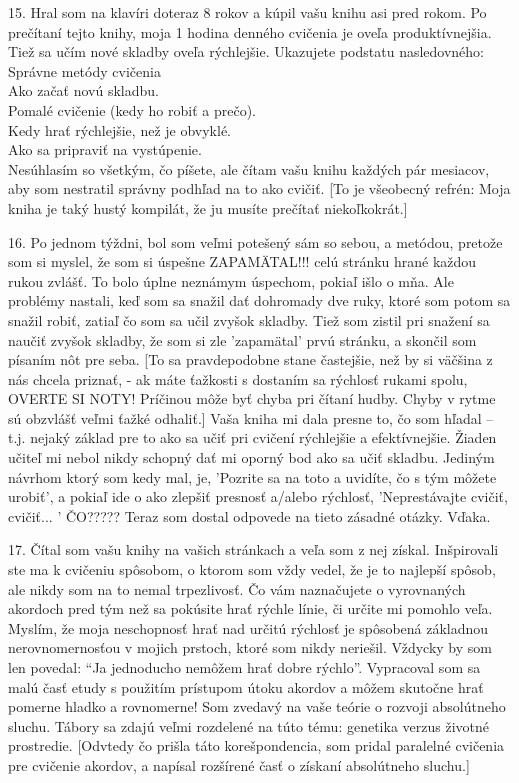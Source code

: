 15. Hral som na klavíri doteraz 8 rokov a kúpil vašu knihu asi pred rokom. Po prečítaní tejto knihy, moja 1 hodina denného cvičenia je oveľa produktívnejšia. Tiež sa učím nové skladby oveľa rýchlejšie. Ukazujete podstatu nasledovného:\\
Správne metódy cvičenia\\
Ako začať novú skladbu.\\
Pomalé cvičenie (kedy ho robiť a prečo).\\
Kedy hrať rýchlejšie, než je obvyklé.\\
Ako sa pripraviť na vystúpenie.\\
Nesúhlasím so všetkým, čo píšete, ale čítam vašu knihu každých pár mesiacov, aby som nestratil správny podhľad na to ako cvičiť. [To je všeobecný refrén: Moja kniha je taký hustý kompilát, že ju musíte prečítať niekoľkokrát.]
\medskip

16. Po jednom týždni, bol som veľmi potešený sám so sebou, a metódou, pretože som si myslel, že som si úspešne ZAPAMÄTAL{\noligatures !!!} celú stránku hrané každou rukou zvlášť. To bolo úplne neznámym úspechom, pokiaľ išlo o mňa. Ale problémy nastali, keď som sa snažil dať dohromady dve ruky, ktoré som potom sa snažil robiť, zatiaľ čo som sa učil zvyšok skladby. Tiež som zistil pri snažení sa naučiť zvyšok skladby, že som si zle 'zapamätal' prvú stránku, a skončil som písaním nôt pre seba. [To sa pravdepodobne stane častejšie, než by si väčšina z nás chcela priznať, - ak máte ťažkosti s dostaním sa rýchlosť rukami spolu, OVERTE SI NOTY! Príčinou môže byť chyba pri čítaní hudby. Chyby v rytme sú obzvlášť veľmi ťažké odhaliť.] Vaša kniha mi dala presne to, čo som hľadal – t.j. nejaký základ pre to ako sa učiť pri cvičení rýchlejšie a efektívnejšie. Žiaden učiteľ mi nebol nikdy schopný dať mi oporný bod ako sa učiť skladbu. Jediným návrhom ktorý som kedy mal, je, 'Pozrite sa na toto a uvidíte, čo s tým môžete urobiť', a pokiaľ ide o ako zlepšiť presnosť a/alebo rýchlosť, 'Neprestávajte cvičiť, cvičiť... ' ČO????? Teraz som dostal odpovede na tieto zásadné otázky. Vďaka.
\medskip

17. Čítal som vašu knihy na vašich stránkach a veľa som z nej získal. Inšpirovali ste ma k cvičeniu spôsobom, o ktorom som vždy vedel, že je to najlepší spôsob, ale nikdy som na to nemal trpezlivosť. Čo vám naznačujete o vyrovnaných akordoch pred tým než sa pokúsite hrať rýchle línie, či určite mi pomohlo veľa. Myslím, že moja neschopnosť hrať nad určitú rýchlosť je spôsobená základnou nerovnomernosťou v mojich prstoch, ktoré som nikdy neriešil. Vždycky by som len povedal: “Ja jednoducho nemôžem hrať dobre rýchlo”. Vypracoval som sa malú časť etudy s použitím prístupom útoku akordov a môžem skutočne hrať pomerne hladko a rovnomerne! Som zvedavý na vaše teórie o rozvoji absolútneho sluchu. Tábory sa zdajú veľmi rozdelené na túto tému: genetika verzus životné prostredie. [Odvtedy čo prišla táto korešpondencia, som pridal paralelné cvičenia pre cvičenie akordov, a napísal rozšírené časť o získaní absolútneho sluchu.]
\medskip

